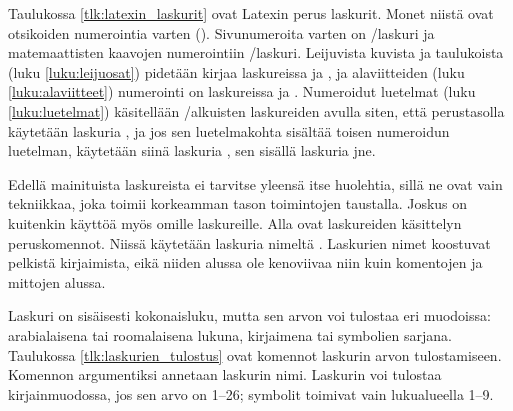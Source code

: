 Taulukossa \ref{tlk:latexin_laskurit} ovat Latexin perus laskurit. Monet
niistä ovat otsikoiden numerointia varten (). Sivunumeroita
varten on \-/laskuri ja matemaattisten kaavojen numerointiin
\-/laskuri. Leijuvista kuvista ja taulukoista (luku
\ref{luku:leijuosat}) pidetään kirjaa laskureissa  ja
, ja alaviitteiden (luku \ref{luku:alaviitteet}) numerointi
on laskureissa  ja . Numeroidut
luetelmat (luku \ref{luku:luetelmat}) käsitellään
\-/alkuisten laskureiden avulla siten, että perustasolla
käytetään laskuria , ja jos sen luetelmakohta sisältää
toisen numeroidun luetelman, käytetään siinä laskuria ,
sen sisällä laskuria  jne.

Edellä mainituista laskureista ei tarvitse yleensä itse huolehtia, sillä
ne ovat vain tekniikkaa, joka toimii korkeamman tason toimintojen
taustalla. Joskus on kuitenkin käyttöä myös omille laskureille. Alla
ovat laskureiden käsittelyn peruskomennot. Niissä käytetään laskuria
nimeltä . Laskurien nimet koostuvat pelkistä kirjaimista,
eikä niiden alussa ole kenoviivaa niin kuin komentojen ja mittojen
alussa.

\begin{koodilohkosis}
  \setcounter{oma}{3}    %
  \addtocounter{oma}{1}  %
  \addtocounter{oma}{-1} %
\end{koodilohkosis}

Laskuri on sisäisesti kokonaisluku, mutta sen arvon voi tulostaa eri
muodoissa: arabialaisena tai roomalaisena lukuna, kirjaimena tai
symbolien sarjana. Taulukossa \ref{tlk:laskurien_tulostus} ovat komennot
laskurin arvon tulostamiseen. Komennon argumentiksi annetaan laskurin
nimi. Laskurin voi tulostaa kirjainmuodossa, jos sen arvo on 1--26;
symbolit toimivat vain lu\-ku\-alueel\-la 1--9.


